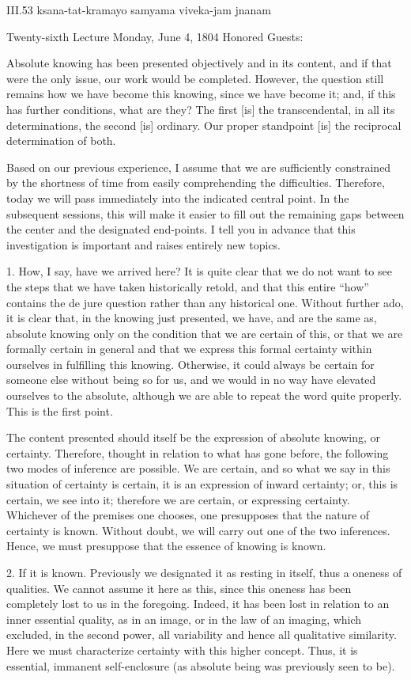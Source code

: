 III.53
ksana-tat-kramayo samyama viveka-jam jnanam

Twenty-sixth Lecture
Monday, June 4, 1804
Honored Guests:

Absolute knowing has been presented
objectively and in its content,
and if that were the only issue,
our work would be completed.
However, the question still remains
how we have become this knowing,
since we have become it;
and, if this has further conditions,
what are they?
The first [is] the transcendental,
in all its determinations,
the second [is] ordinary.
Our proper standpoint [is]
the reciprocal determination of both.

Based on our previous experience,
I assume that we are sufficiently
constrained by the shortness of time
from easily comprehending the difficulties.
Therefore, today we will pass immediately
into the indicated central point.
In the subsequent sessions,
this will make it easier to fill out
the remaining gaps between the center
and the designated end-points.
I tell you in advance that
this investigation is important
and raises entirely new topics.

1. How, I say, have we arrived here?
It is quite clear that we do not want
to see the steps that we have taken historically retold,
and that this entire “how” contains the de jure question
rather than any historical one.
Without further ado, it is clear that,
in the knowing just presented,
we have, and are the same as, absolute knowing
only on the condition that we are certain of this,
or that we are formally certain in general
and that we express this formal certainty
within ourselves in fulfilling this knowing.
Otherwise, it could always be certain
for someone else without being so for us,
and we would in no way have elevated
ourselves to the absolute,
although we are able to
repeat the word quite properly.
This is the first point.

The content presented should itself be
the expression of absolute knowing, or certainty.
Therefore, thought in relation to what has gone before,
the following two modes of inference are possible.
We are certain, and so what we say
in this situation of certainty is certain,
it is an expression of inward certainty;
or, this is certain, we see into it;
therefore we are certain, or expressing certainty.
Whichever of the premises one chooses,
one presupposes that the nature of certainty is known.
Without doubt, we will carry out one of the two inferences.
Hence, we must presuppose that the essence of knowing is known.

2. If it is known.
Previously we designated it as resting in itself,
thus a oneness of qualities.
We cannot assume it here as this,
since this oneness has been
completely lost to us in the foregoing.
Indeed, it has been lost in relation to
an inner essential quality, as in an image,
or in the law of an imaging,
which excluded, in the second power,
all variability and hence all qualitative similarity.
Here we must characterize certainty with this higher concept.
Thus, it is essential, immanent self-enclosure
(as absolute being was previously seen to be).

